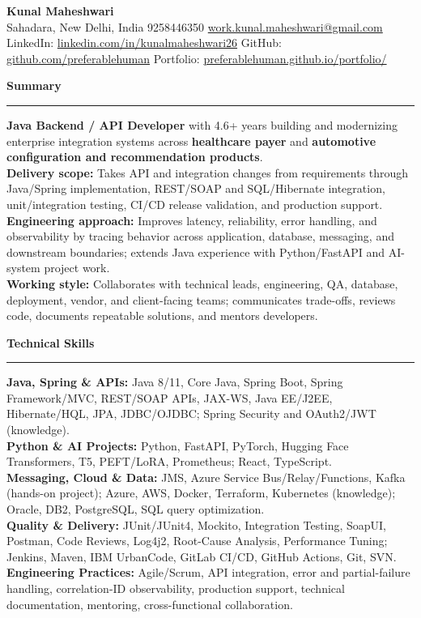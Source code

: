 \documentclass[11pt,letterpaper]{article}
\newcommand{\ressection}[1]{\Needspace{5\baselineskip}\vspace{8pt}\par\textbf{#1}\par\vspace{2pt}\hrule\vspace{5pt}}
\begin{document}
\pagestyle{empty}\raggedright\fontsize{11}{12.5}\selectfont

{\Large \textbf{Kunal Maheshwari}}\\
Sahadara, New Delhi, India \textbar{} 9258446350 \textbar{} \href{mailto:work.kunal.maheshwari@gmail.com}{work.kunal.maheshwari@gmail.com}\\
LinkedIn: \href{https://www.linkedin.com/in/kunalmaheshwari26}{linkedin.com/in/kunalmaheshwari26} \textbar{} GitHub: \href{https://github.com/preferablehuman}{github.com/preferablehuman} \textbar{} Portfolio: \href{https://preferablehuman.github.io/portfolio/}{preferablehuman.github.io/portfolio/}

\ressection{Summary}
\textbf{Java Backend / API Developer} with 4.6+ years building and modernizing enterprise integration systems across \textbf{healthcare payer} and \textbf{automotive configuration and recommendation products}.\\[2pt]
\textbf{Delivery scope:} Takes API and integration changes from requirements through Java/Spring implementation, REST/SOAP and SQL/Hibernate integration, unit/integration testing, CI/CD release validation, and production support.\\[2pt]
\textbf{Engineering approach:} Improves latency, reliability, error handling, and observability by tracing behavior across application, database, messaging, and downstream boundaries; extends Java experience with Python/FastAPI and AI-system project work.\\[2pt]
\textbf{Working style:} Collaborates with technical leads, engineering, QA, database, deployment, vendor, and client-facing teams; communicates trade-offs, reviews code, documents repeatable solutions, and mentors developers.

\ressection{Technical Skills}
\textbf{Java, Spring \& APIs:} Java 8/11, Core Java, Spring Boot, Spring Framework/MVC, REST/SOAP APIs, JAX-WS, Java EE/J2EE, Hibernate/HQL, JPA, JDBC/OJDBC; Spring Security and OAuth2/JWT (knowledge).\\
\textbf{Python \& AI Projects:} Python, FastAPI, PyTorch, Hugging Face Transformers, T5, PEFT/LoRA, Prometheus; React, TypeScript.\\
\textbf{Messaging, Cloud \& Data:} JMS, Azure Service Bus/Relay/Functions, Kafka (hands-on project); Azure, AWS, Docker, Terraform, Kubernetes (knowledge); Oracle, DB2, PostgreSQL, SQL query optimization.\\
\textbf{Quality \& Delivery:} JUnit/JUnit4, Mockito, Integration Testing, SoapUI, Postman, Code Reviews, Log4j2, Root-Cause Analysis, Performance Tuning; Jenkins, Maven, IBM UrbanCode, GitLab CI/CD, GitHub Actions, Git, SVN.\\
\textbf{Engineering Practices:} Agile/Scrum, API integration, error and partial-failure handling, correlation-ID observability, production support, technical documentation, mentoring, cross-functional collaboration.
\end{document}
